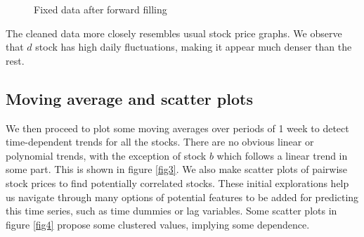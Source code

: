 \documentclass{article}
\begin{document}
\begin{figure}[htb]
\begin{minipage}{0.5\textwidth}
		\caption{Fixed data after forward filling}
		\label{fig2}
	\end{minipage}
\end{figure}

The cleaned data more closely resembles usual stock price graphs. We observe that $d$ stock has high daily fluctuations, making it appear much denser than the rest.  

\subsection{Moving average and scatter plots}
We then proceed to plot some moving averages over periods of 1 week to detect time-dependent trends for all the stocks. There are no obvious linear or polynomial trends, with the exception of stock $b$ which follows a linear trend in some part. This is shown in figure \ref{fig3}. We also make scatter plots of pairwise stock prices to find potentially correlated stocks. These initial explorations help us navigate through many options of potential features to be added for predicting this time series, such as time dummies or lag variables. Some scatter plots in figure \ref{fig4} propose some clustered values, implying some dependence. 
\end{document}
